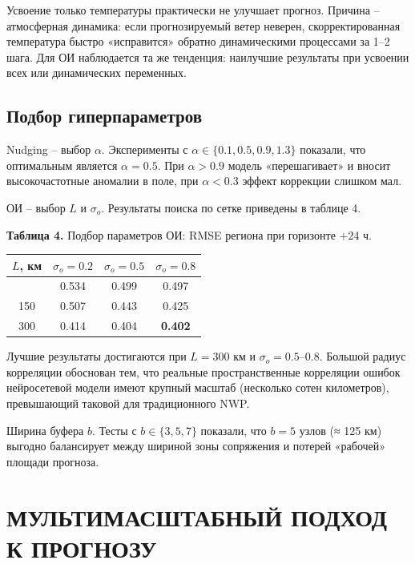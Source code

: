 \documentclass[14pt,a4paper]{extarticle}
\newcounter{none}
\numberwithin{table}{section}
\numberwithin{figure}{section}
\numberwithin{equation}{section}
\begin{document}
Усвоение только температуры практически не улучшает прогноз. Причина --
атмосферная динамика: если прогнозируемый ветер неверен,
скорректированная температура быстро «исправится» обратно динамическими
процессами за 1--2 шага. Для ОИ наблюдается та же тенденция: наилучшие
результаты при усвоении всех или динамических переменных.

\subsection{Подбор гиперпараметров}\label{ux43fux43eux434ux431ux43eux440-ux433ux438ux43fux435ux440ux43fux430ux440ux430ux43cux435ux442ux440ux43eux432}

Nudging -- выбор \(\alpha\). Эксперименты с
\(\alpha \in \{0.1, 0.5, 0.9, 1.3\}\) показали, что оптимальным является
\(\alpha = 0.5\). При \(\alpha > 0.9\) модель «перешагивает» и вносит
высокочастотные аномалии в поле, при \(\alpha < 0.3\) эффект коррекции
слишком мал.

ОИ -- выбор \(L\) и \(\sigma_o\). Результаты поиска по сетке
приведены в таблице 4.

\textbf{Таблица 4.} Подбор параметров ОИ: RMSE региона при горизонте +24
ч.

{\def\LTcaptype{none} %
\begin{longtable}[]{@{}cccc@{}}
\toprule\noalign{}
\(L\), км & \(\sigma_o = 0.2\) & \(\sigma_o = 0.5\) &
\(\sigma_o = 0.8\) \\
\midrule\noalign{}
\endhead
\bottomrule\noalign{}
\endlastfoot
50 & 0.534 & 0.499 & 0.497 \\
150 & 0.507 & 0.443 & 0.425 \\
300 & 0.414 & 0.404 & \textbf{0.402} \\
\end{longtable}
}

Лучшие результаты достигаются при \(L = 300\) км и
\(\sigma_o = 0.5\)--\(0.8\). Большой радиус корреляции обоснован тем,
что реальные пространственные корреляции ошибок нейросетевой модели
имеют крупный масштаб (несколько сотен километров), превышающий таковой
для традиционного NWP.

Ширина буфера \(b\). Тесты с \(b \in \{3, 5, 7\}\) показали,
что \(b = 5\) узлов (≈ 125 км) выгодно балансирует между шириной зоны
сопряжения и потерей «рабочей» площади прогноза.


\newpage

\section{МУЛЬТИМАСШТАБНЫЙ ПОДХОД К ПРОГНОЗУ}\label{ux43cux443ux43bux44cux442ux438ux440ux435ux437ux43eux43bux44eux446ux438ux43eux43dux43dux44bux439-ux43fux43eux434ux445ux43eux434-ux43a-ux43fux440ux43eux433ux43dux43eux437ux443}
\end{document}
